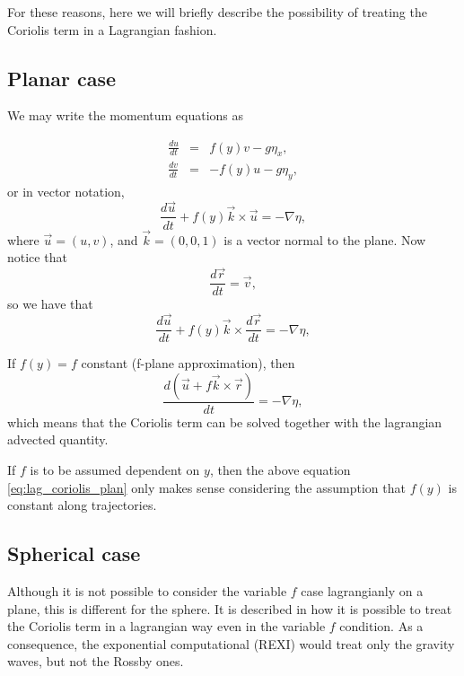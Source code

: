 \documentclass[10pt,a4paper]{article}
\begin{document}
For these reasons, here we will briefly describe the possibility of treating the Coriolis term in a Lagrangian fashion.

\subsection{Planar case}
We may write the momentum equations as

\begin{eqnarray}
\frac{du}{dt}&=&  f(y)v -g\eta_x,\\
\frac{dv}{dt} &=& -f(y)u- g\eta_y, 
\end{eqnarray}
or in vector notation,
\begin{equation}
\frac{d\vec{u}}{dt}+f(y)\vec{k}\times\vec{u}=-\nabla \eta, 
\end{equation}
where $\vec{u}=(u,v)$, and $\vec{k}=(0,0,1)$ is a vector normal to the plane. Now notice that 
\begin{equation}
\frac{d \vec{r}}{dt} = \vec{v},
\end{equation}
so we have that
\begin{equation}
\frac{d\vec{u}}{dt}+f(y)\vec{k}\times\frac{d \vec{r}}{dt}=-\nabla \eta, 
\end{equation}

If $f(y)=f$ constant (f-plane approximation), then
\begin{equation}
\frac{d\left( \vec{u} + f\vec{k}\times \vec{r}\right)}{dt}=-\nabla \eta, 
\label{eq:lag_coriolis_plan}
\end{equation}
which means that the Coriolis term can be solved together with the lagrangian advected quantity. 

If $f$ is to be assumed dependent on $y$, then the above equation \eqref{eq:lag_coriolis_plan} only makes sense considering the assumption that $f(y)$ is constant along trajectories. 

\subsection{Spherical case}

Although it is not possible to consider the variable $f$ case lagrangianly on a plane, this is different for the sphere. It is described in \cite{Temperton1997} how it is possible to treat the Coriolis term in a lagrangian way even in the variable $f$ condition. As a consequence, the exponential computational (REXI) would treat only the gravity waves, but not the Rossby ones.
\end{document}
